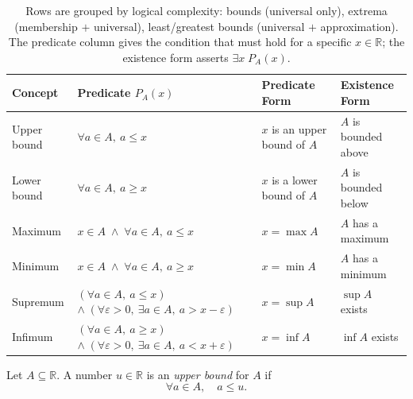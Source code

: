 \begin{table}[h]
\centering
\renewcommand{\arraystretch}{1.6}
\begin{tabular}{@{} p{2.2cm} p{5.8cm} p{3.2cm} p{3.2cm} @{}}
\toprule
\textbf{Concept} & \textbf{Predicate} $P_A(x)$ & \textbf{Predicate Form} & \textbf{Existence Form} \\
\midrule
Upper bound
  & $\forall a \in A,\ a \leq x$
  & $x$ is an upper bound of $A$
  & $A$ is bounded above \\
\addlinespace[0.2em]
Lower bound
  & $\forall a \in A,\ a \geq x$
  & $x$ is a lower bound of $A$
  & $A$ is bounded below \\
\midrule
Maximum
  & $x \in A \;\land\; \forall a \in A,\ a \leq x$
  & $x = \max A$
  & $A$ has a maximum \\
\addlinespace[0.2em]
Minimum
  & $x \in A \;\land\; \forall a \in A,\ a \geq x$
  & $x = \min A$
  & $A$ has a minimum \\
\midrule
Supremum
  & $(\forall a \in A,\ a \leq x)$
    $\land\; (\forall \varepsilon > 0,\ \exists a \in A,\ a > x - \varepsilon)$
  & $x = \sup A$
  & $\sup A$ exists \\
\addlinespace[0.2em]
Infimum
  & $(\forall a \in A,\ a \geq x)$
    $\land\; (\forall \varepsilon > 0,\ \exists a \in A,\ a < x + \varepsilon)$
  & $x = \inf A$
  & $\inf A$ exists \\
\bottomrule
\end{tabular}
\caption*{\footnotesize
  Rows are grouped by logical complexity: bounds (universal only),
  extrema (membership $+$ universal), least/greatest bounds
  (universal $+$ approximation).
  The predicate column gives the condition that must hold for a
  specific $x \in \mathbb{R}$; the existence form asserts $\exists x\; P_A(x)$.}
\end{table}


\begin{tcolorbox}[colback=propbox, colframe=propborder, arc=2pt,
  left=6pt, right=6pt, top=4pt, bottom=4pt,
  title={\small\textbf{Definition (Upper Bound)}},
  fonttitle=\small\bfseries]
Let $A \subseteq \mathbb{R}$.
A number $u \in \mathbb{R}$ is an \emph{upper bound} for $A$ if
\[
\forall a \in A,\quad a \le u.
\]
\end{tcolorbox}

